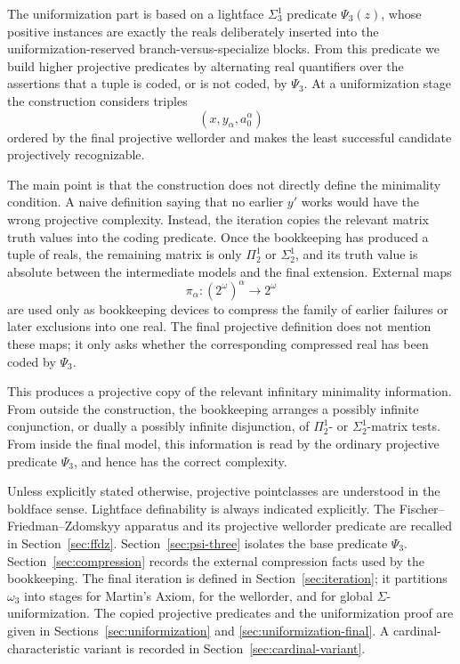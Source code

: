 \documentclass[11pt]{article}
\theoremstyle{plain}
\theoremstyle{definition}
\theoremstyle{remark}
\newcommand{\PsiThree}{\Psi_{3}}
\begin{document}
The uniformization part is based on a lightface \(\Sigma^1_3\) predicate
\(\PsiThree(z)\), whose positive instances are exactly the reals deliberately
inserted into the uniformization-reserved branch-versus-specialize blocks.  From
this predicate we build higher projective predicates by alternating real
quantifiers over the assertions that a tuple is coded, or is not coded, by
\(\PsiThree\).  At a uniformization stage the construction considers triples
\[
(x,y_\alpha,a^\alpha_0)
\]
ordered by the final projective wellorder and makes the least successful
candidate projectively recognizable.

The main point is that the construction does not directly define the
minimality condition.  A naive definition saying that no earlier \(y'\) works
would have the wrong projective complexity.  Instead, the iteration copies the
relevant matrix truth values into the coding predicate.  Once the bookkeeping has
produced a tuple of reals, the remaining matrix is only \(\Pi^1_2\) or
\(\Sigma^1_2\), and its truth value is absolute between the intermediate models
and the final extension.  External maps
\[
\pi_\alpha:(2^\omega)^\alpha\longrightarrow 2^\omega
\]
are used only as bookkeeping devices to compress the family of earlier failures
or later exclusions into one real.  The final projective definition does not
mention these maps; it only asks whether the corresponding compressed real has
been coded by \(\PsiThree\).

This produces a projective copy of the relevant infinitary minimality
information.  From outside the construction, the bookkeeping arranges a possibly
infinite conjunction, or dually a possibly infinite disjunction, of
\(\Pi^1_2\)- or \(\Sigma^1_2\)-matrix tests.  From inside the final model, this
information is read by the ordinary projective predicate \(\PsiThree\), and hence
has the correct complexity.

Unless explicitly stated otherwise, projective pointclasses are understood in the
boldface sense.  Lightface definability is always indicated explicitly.  The
Fischer--Friedman--Zdomskyy apparatus and its projective wellorder predicate are
recalled in Section~\ref{sec:ffdz}.  Section~\ref{sec:psi-three} isolates the
base predicate \(\PsiThree\).  Section~\ref{sec:compression} records the
external compression facts used by the bookkeeping.  The final iteration is
defined in Section~\ref{sec:iteration}; it partitions \(\omega_3\) into stages
for Martin's Axiom, for the wellorder, and for global
\(\Sigma\)-uniformization.  The copied projective predicates and the
uniformization proof are given in Sections~\ref{sec:uniformization} and
\ref{sec:uniformization-final}.  A cardinal-characteristic variant is recorded in
Section~\ref{sec:cardinal-variant}.
\end{document}
